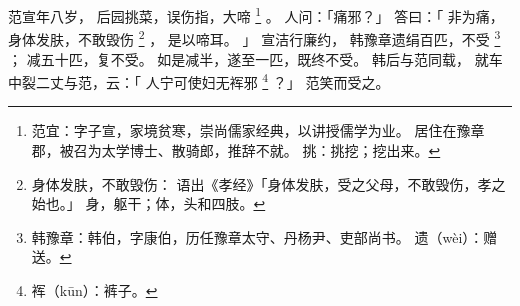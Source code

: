 
\switchcolumn*[\section{}]

范宣年八岁，
后园挑菜，误伤指，大啼%
\footnote{%
    范宜：字子宣，家境贫寒，崇尚儒家经典，以讲授儒学为业。
          居住在豫章郡，被召为太学博士、散骑郎，推辞不就。
    挑：挑挖；挖出来。
}%
。
人问：「痛邪？」
答曰：「
    非为痛，
    身体发肤，不敢毁伤%
    \footnote{%
        身体发肤，不敢毁伤：
            语出《孝经》「身体发肤，受之父母，不敢毁伤，孝之始也。」
            身，躯干；体，头和四肢。
    }%
    ，
    是以啼耳。
」
宣洁行廉约，
韩豫章遗绢百匹，不受%
\footnote{%
    韩豫章：韩伯，字康伯，历任豫章太守、丹杨尹、吏部尚书。
    遗（wèi）：赠送。
}%
；
减五十匹，复不受。
如是减半，遂至一匹，既终不受。
韩后与范同载，
就车中裂二丈与范，云：「
    人宁可使妇无裈邪%
    \footnote{%
        裈（kūn）：裤子。
    }%
？」
范笑而受之。

\switchcolumn

%


